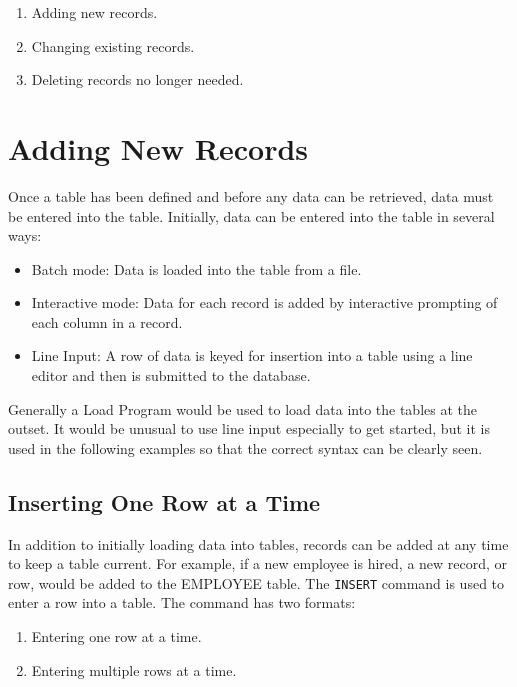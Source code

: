 \begin{enumerate}
\item Adding new records.
\item Changing existing records.
\item Deleting records no longer needed.
\end{enumerate}

\section{Adding New Records}

Once a table has been defined and before any data can be retrieved,
data must be entered into the table.  Initially, data can be entered
into the table in several ways:

\begin{itemize}
\item Batch mode: Data is loaded into the table from a file.

\item Interactive mode: Data for each record is added by interactive
prompting of each column in a record.

\item Line Input:  A row of data is keyed for insertion into a table
using a line editor and then is submitted to the database.
\end{itemize}

Generally a Load Program would be used to load data into the tables at
the outset.  It would be unusual to use line input especially to get
started, but it is used in the following examples so that the correct
syntax can be clearly seen.

\subsection{Inserting One Row at a Time}

In addition to initially loading data into tables, records can be
added at any time to keep a table current.  For example, if a new
employee is hired, a new record, or row, would be added to the
EMPLOYEE table.  The \verb`INSERT` command is used to enter a row into a
table.  The command has two formats:

\begin{enumerate}
\item Entering one row at a time.
\item Entering multiple rows at a time.
\end{enumerate}

